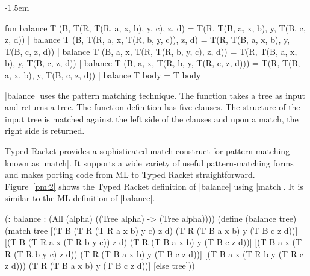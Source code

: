 \begin{figure*}[ht]
  \begin{adjustwidth}{-1.5em}{}
  \begin{plain}
  \begin{schemedisplay}
 fun balance T (B, T(R, T(R, a, x, b), y, c), z, d) = T(R, T(B, a, x, b), y, T(B, c, z, d))
   | balance T (B, T(R, a, x, T(R, b, y, c)), z, d) = T(R, T(B, a, x, b), y, T(B, c, z, d))
   | balance T (B, a, x, T(R, T(R, b, y, c), z, d)) = T(R, T(B, a, x, b), y, T(B, c, z, d))
   | balance T (B, a, x, T(R, b, y, T(R, c, z, d))) = T(R, T(B, a, x, b), y, T(B, c, z, d))
   | balance T body = T body
  \end{schemedisplay}
  \end{plain}
  \caption{Pattern Matching in ML}
  \label{pm:1}
  \end{adjustwidth}
\end{figure*}
\noindent
\scheme|balance| uses the pattern matching technique. The function takes
a tree as input and returns a tree. The function definition has five
clauses. The structure of the input tree is matched against the left
side of the clauses and upon a match, the right side is returned.

Typed Racket provides a sophisticated match construct for pattern
matching known as \scheme|match|. It supports a wide variety of useful
pattern-matching forms and makes porting code from ML to Typed Racket
straightforward. Figure~\ref{pm:2} shows the Typed Racket definition of
\scheme|balance| using \scheme|match|. It is similar to the ML
definition of \scheme|balance|.



\begin{figure*}[ht]
  \begin{plain}
 \begin{schemedisplay}

(: balance : (All (alpha) ((Tree alpha) -> (Tree alpha))))
(define (balance tree)
  (match tree
    [(T B (T R (T R a x b) y c) z d)   (T R (T B a x b) y (T B c z d))]
    [(T B (T R a x (T R b y c)) z d)   (T R (T B a x b) y (T B c z d))]
    [(T B a x (T R (T R b y c) z d))   (T R (T B a x b) y (T B c z d))]
    [(T B a x (T R b y (T R c z d)))   (T R (T B a x b) y (T B c z d))]
    [else tree]))

 \end{schemedisplay}
  \end{plain}
  \caption{Pattern Matching in Typed Racket}
  \label{pm:2}
\end{figure*}

